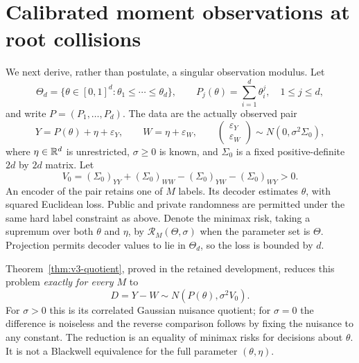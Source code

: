 \section{Calibrated moment observations at root collisions}\label{sec:v4-collisions}

We next derive, rather than postulate, a singular observation modulus.
Let
\[
 \Theta_d=\{\theta\in[0,1]^d:\theta_1\le\cdots\le\theta_d\},
 \qquad P_j(\theta)=\sum_{i=1}^d\theta_i^j,\quad 1\le j\le d,
\]
and write $P=(P_1,\ldots,P_d)$. The data are the actually observed pair
\begin{equation}
 Y=P(\theta)+\eta+\varepsilon_Y,\qquad
 W=\eta+\varepsilon_W,\qquad
 \begin{pmatrix}\varepsilon_Y\\\varepsilon_W\end{pmatrix}
 \sim N(0,\sigma^2\Sigma_0),                                   \label{eq:v4-moment-pair}
\end{equation}
where $\eta\in\mathbb R^d$ is unrestricted, $\sigma\ge0$ is known, and
$\Sigma_0$ is a fixed positive-definite $2d$ by $2d$ matrix.
Let
\[
 V_0=(\Sigma_0)_{YY}+(\Sigma_0)_{WW}
              -(\Sigma_0)_{YW}-(\Sigma_0)_{WY}>0.
\]
An encoder of the pair retains one of $M$ labels. Its decoder estimates
$\theta$, with squared Euclidean loss. Public and private randomness
are permitted under the same hard label constraint as above. Denote
the minimax risk, taking a supremum over both $\theta$ and $\eta$,
by $\mathcal R_M(\Theta,\sigma)$ when the parameter set is $\Theta$.
Projection permits decoder values to lie in $\Theta_d$, so the loss
is bounded by $d$.

Theorem~\ref{thm:v3-quotient}, proved in the retained development,
reduces this problem \emph{exactly for every $M$} to
\begin{equation}
 D=Y-W\sim N(P(\theta),\sigma^2V_0).                             \label{eq:v4-moment-difference}
\end{equation}
For $\sigma>0$ this is its correlated Gaussian nuisance quotient;
for $\sigma=0$ the difference is noiseless and the reverse comparison
follows by fixing the nuisance to any constant. The reduction is an
equality of minimax risks for decisions about $\theta$. It is not a
Blackwell equivalence for the full parameter $(\theta,\eta)$.

